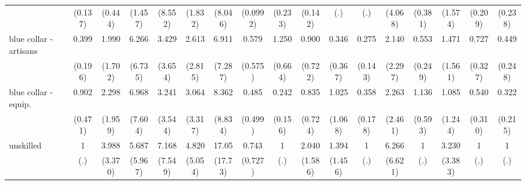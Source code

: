 {\begin{tabular}{l*{16}{c}}
                    &     (0.137)         &     (0.444)         &     (1.457)         &     (8.552)         &     (1.832)         &     (8.046)         &    (0.0992)         &     (0.233)         &     (0.142)         &         (.)         &         (.)         &     (4.068)         &     (0.381)         &     (1.574)         &     (0.209)         &     (0.238)         \\
[1em]
blue collar - artisans&       0.399         &       1.990         &       6.266         &       3.429         &       2.613         &       6.911         &       0.579         &       1.250         &       0.900         &       0.346         &       0.275\sym{*}  &       2.140         &       0.553         &       1.471         &       0.727         &       0.449         \\
                    &     (0.196)         &     (1.702)         &     (6.735)         &     (3.654)         &     (2.815)         &     (7.287)         &     (0.575)         &     (0.664)         &     (0.722)         &     (0.367)         &     (0.143)         &     (2.297)         &     (0.249)         &     (1.561)         &     (0.327)         &     (0.248)         \\
[1em]
blue collar - equip.&       0.902         &       2.298         &       6.968         &       3.241         &       3.064         &       8.362\sym{*}  &       0.485         &       0.242\sym{*}  &       0.835         &       1.025         &       0.358\sym{*}  &       2.263         &       1.136         &       1.085         &       0.540         &       0.322         \\
                    &     (0.471)         &     (1.959)         &     (7.604)         &     (3.544)         &     (3.317)         &     (8.834)         &     (0.499)         &     (0.156)         &     (0.724)         &     (1.068)         &     (0.178)         &     (2.461)         &     (0.593)         &     (1.244)         &     (0.310)         &     (0.215)         \\
[1em]
unskilled           &           1         &       3.988         &       5.687         &       7.168         &       4.820         &       17.05\sym{**} &       0.743         &           1         &       2.040         &       1.394         &           1         &       6.266         &           1         &       3.230         &           1         &           1         \\
                    &         (.)         &     (3.370)         &     (5.967)         &     (7.549)         &     (5.054)         &     (17.73)         &     (0.727)         &         (.)         &     (1.586)         &     (1.456)         &         (.)         &     (6.621)         &         (.)         &     (3.383)         &         (.)         &         (.)         \\

\end{tabular}}
